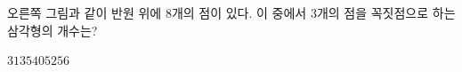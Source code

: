 \hspace*{2mm}\begin{minipage}[t]{\dimexpr\linewidth-2mm\relax}\vspace{0pt}
\noindent\begin{minipage}[t]{0.58\linewidth}\vspace{0pt}\raggedright 오른쪽 그림과 같이 반원 위에 $8$개의 점이 있다. 이 중에서 $3$개의 점을 꼭짓점으로 하는 삼각형의 개수는?\end{minipage}\hfill\begin{minipage}[t]{0.4\linewidth}\vspace{0pt}\centering \resizebox{\ifdim\width>\linewidth\linewidth\else\width\fi}{!}{}\end{minipage}\par
\begin{choices32}{$31$}{$35$}{$40$}{$52$}{$56$}\end{choices32}\end{minipage}
